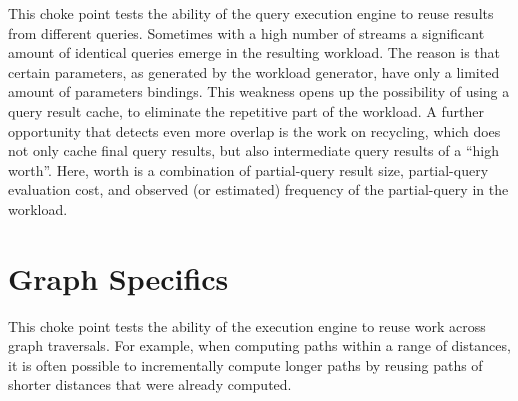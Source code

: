 

This choke point tests the ability of the query execution engine to reuse results from different queries. Sometimes with a high number of streams a significant amount of identical queries emerge in the resulting workload.
The reason is that certain parameters, as generated by the workload generator, have only a limited amount of parameters bindings.
This weakness opens up the possibility of using a query result cache, to eliminate the repetitive part of the workload.
A further opportunity that detects even more overlap is the work on recycling, which does not only cache final query results, but also intermediate query results of a ``high worth''.
Here, worth is a combination of partial-query result size, partial-query evaluation cost, and observed (or estimated) frequency of the partial-query in the workload.




\section{Graph Specifics}



This choke point tests the ability of the execution engine to reuse work across
graph traversals. For example, when computing paths within a range of distances,
it is often possible to incrementally compute longer paths by reusing paths of
shorter distances that were already computed.





